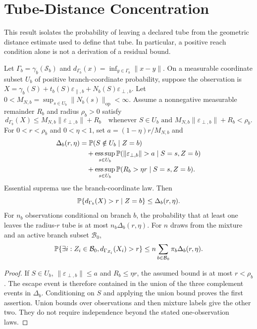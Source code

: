 \section{Tube-Distance Concentration}
\label{app:tube-tails}
This result isolates the probability of leaving a declared tube from the
geometric distance estimate used to define that tube. In particular, a
positive reach condition alone is not a derivation of a residual bound.

\begin{proposition}
\label{prop:tube-concentration}
Let $\Gamma_b=\gamma_b(\mathcal S_b)$ and
$d_{\Gamma_b}(x)=\inf_{y\in\Gamma_b}\|x-y\|$. On a measurable coordinate
subset $U_b$ of positive branch-coordinate probability, suppose the observation is
$X=\gamma_b(S)+t_b(S)\varepsilon_{\parallel,b}
+N_b(S)\varepsilon_{\perp,b}$. Let
$0<M_{N,b}=\sup_{s\in U_b}\|N_b(s)\|_{\mathrm{op}}<\infty$.
Assume a nonnegative measurable remainder $R_b$ and radius $\rho_b>0$
satisfy
\[
 d_{\Gamma_b}(X)\le M_{N,b}\|\varepsilon_{\perp,b}\|+R_b
 \quad\text{whenever }S\in U_b\text{ and }
 M_{N,b}\|\varepsilon_{\perp,b}\|+R_b<\rho_b.
\]
For $0<r<\rho_b$ and $0<\eta<1$, set $a=(1-\eta)r/M_{N,b}$ and
\begin{align*}
 \Delta_b(r,\eta)
 &=\Pbb(S\notin U_b\mid Z=b)\\
 &\quad+\operatorname*{ess\,sup}_{s\in U_b}
          \Pbb(\|\varepsilon_{\perp,b}\|>a\mid S=s,Z=b)\\
 &\quad+\operatorname*{ess\,sup}_{s\in U_b}
          \Pbb(R_b>\eta r\mid S=s,Z=b).
\end{align*}
Essential suprema use the branch-coordinate law. Then
\[
 \mathbb P\{d_{\Gamma_b}(X)>r\mid Z=b\}\le\Delta_b(r,\eta).
\]
For $n_b$ observations conditional on branch $b$, the probability that at
least one leaves the radius-$r$ tube is at most $n_b\Delta_b(r,\eta)$.
For $n$ draws from the mixture and an active branch subset $\mathcal B_0$,
\[
 \mathbb P\{\exists i:Z_i\in\mathcal B_0,
                  d_{\Gamma_{Z_i}}(X_i)>r\}
       \le n\sum_{b\in\mathcal B_0}\pi_b\Delta_b(r,\eta).
\]
\end{proposition}
\begin{proof}
If $S\in U_b$, $\|\varepsilon_{\perp,b}\|\le a$ and $R_b\le\eta r$,
the assumed bound is at most $r<\rho_b$. The escape event is therefore
contained in the union of the three complement events in $\Delta_b$.
Conditioning on $S$ and applying the union bound proves the first assertion.
Union bounds over observations and then mixture labels give the other two.
They do not require independence beyond the stated one-observation laws.
\end{proof}

